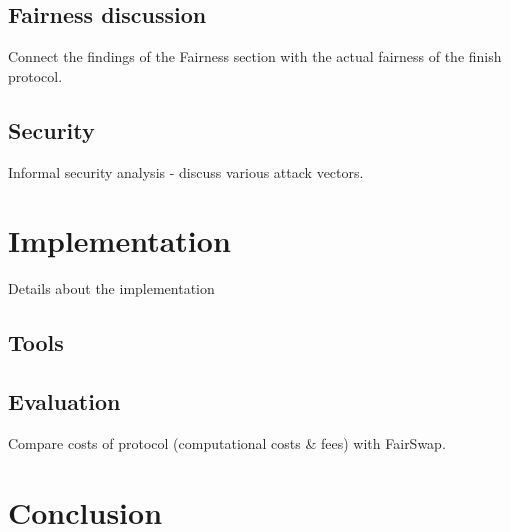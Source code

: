 \documentclass{cacthesis}
\newcounter{protocol}
\begin{document}
        \section{Fairness discussion}
	    Connect the findings of the Fairness section with the actual fairness of the finish protocol.
	    
	    \section{Security}
	    Informal security analysis - discuss various attack vectors.
	    
	\chapter{Implementation}
	    Details about the implementation
	    \section{Tools}
	    
	    \section{Evaluation}
	    Compare costs of protocol (computational costs \& fees) with FairSwap.
	    
	\chapter{Conclusion}
    
	
	\newpage
    
    
	
	\appendix
\end{document}
